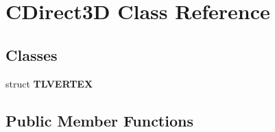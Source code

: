 \hypertarget{classCDirect3D}{\section{C\-Direct3\-D Class Reference}
\label{classCDirect3D}
}
\subsection*{Classes}
\begin{DoxyCompactItemize}
\item 
struct {\bfseries T\-L\-V\-E\-R\-T\-E\-X}
\end{DoxyCompactItemize}
\subsection*{Public Member Functions}
